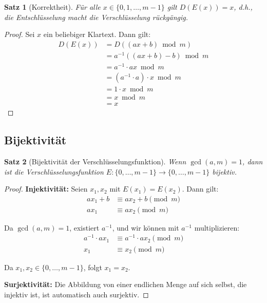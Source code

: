 ﻿\documentclass[12pt,a4paper]{article}
\newtheorem{theorem}{Satz}
\begin{document}
	\begin{theorem}[Korrektheit]
		Für alle $x \in \{0, 1, \ldots, m-1\}$ gilt $D(E(x)) = x$, d.h., die Entschlüsselung macht die Verschlüsselung rückgängig.
	\end{theorem}
	
	\begin{proof}
		Sei $x$ ein beliebiger Klartext. Dann gilt:
		\begin{align}
			D(E(x)) &= D((ax + b) \bmod m) \\
			&= a^{-1}((ax + b) - b) \bmod m \\
			&= a^{-1} \cdot ax \bmod m \\
			&= (a^{-1} \cdot a) \cdot x \bmod m \\
			&= 1 \cdot x \bmod m \\
			&= x \bmod m \\
			&= x
		\end{align}
	\end{proof}
	
	\subsection{Bijektivität}
	
	\begin{theorem}[Bijektivität der Verschlüsselungsfunktion]
		Wenn $\gcd(a,m) = 1$, dann ist die Verschlüsselungsfunktion $E: \{0,\ldots,m-1\} \to \{0,\ldots,m-1\}$ bijektiv.
	\end{theorem}
	
	\begin{proof}
		\textbf{Injektivität:} Seien $x_1, x_2$ mit $E(x_1) = E(x_2)$. Dann gilt:
		\begin{align}
			ax_1 + b &\equiv ax_2 + b \pmod{m} \\
			ax_1 &\equiv ax_2 \pmod{m}
		\end{align}
		
		Da $\gcd(a,m) = 1$, existiert $a^{-1}$, und wir können mit $a^{-1}$ multiplizieren:
		\begin{align}
			a^{-1} \cdot ax_1 &\equiv a^{-1} \cdot ax_2 \pmod{m} \\
			x_1 &\equiv x_2 \pmod{m}
		\end{align}
		
		Da $x_1, x_2 \in \{0,\ldots,m-1\}$, folgt $x_1 = x_2$.
		
		\textbf{Surjektivität:} Die Abbildung von einer endlichen Menge auf sich selbst, die injektiv ist, ist automatisch auch surjektiv.
	\end{proof}
	
\end{document}
